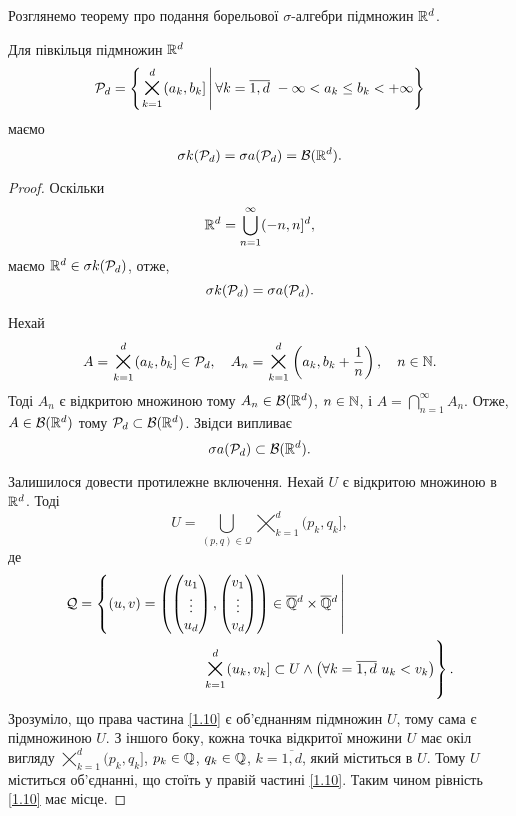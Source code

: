 Розглянемо теорему про подання борельової $\sigma$-алгебри підмножин ${\mathbb R}^d$.

\begin{theorem}
	\label{th-1-6}
	Для півкільця підмножин ${\mathbb R}^d$
	$$
	\PP_d=\left\{\bigtimes_{k=1}^d (a_k,b_k]\midd \forall k=\overline{1,d}\ -\infty< a_k\leq b_k< +\infty\right\}
	$$
	маємо
	$$
	\sigma k(\mathcal P_d)=\sigma a(\mathcal P_d)=\mathcal B({\mathbb R}^d).
	$$
\end{theorem}

\begin{proof}
	Оскільки
	$$
	{\mathbb R}^d=\bigcup_{n=1}^\infty (-n,n]^d,
	$$
	маємо ${\mathbb R}^d\in \sigma k(\mathcal P_d)$, отже, 
	\begin{equation}
	\label{1.8}
	\sigma k(\mathcal P_d)=\sigma a(\mathcal P_d).
	\end{equation}

Нехай
$$
A=\bigtimes_{k=1}^d (a_k,b_k]\in\PP_d, \quad A_n=\bigtimes_{k=1}^d \left(a_k,b_k+\frac1n\right),\quad n\in\N.
$$
Тоді $A_n$ є відкритою множиною тому
$A_n\in\mathcal B({\mathbb R}^d)$, $n\in{\mathbb N}$, і $\displaystyle A=\bigcap_{n=1}^\infty A_n$. Отже, $A\in\mathcal B({\mathbb R}^d)$ тому $\mathcal P_d\subset\mathcal B({\mathbb R}^d)$. Звідси випливає 
\begin{equation}
\label{1.9}
\sigma a(\mathcal P_d)\subset\mathcal B({\mathbb R}^d).
\end{equation}


Залишилося довести протилежне включення. Нехай $U$ є відкритою множиною в ${\mathbb R}^d$. Тоді
\begin{equation}
\label{1.10}
U=\bigcup_{(p,q)\in\mathcal Q} \bigtimes_{k=1}^d (p_k,q_k], 
\end{equation}
де 
\begin{align*}
\mathcal Q&= \left\{(u,v)=\left(\begin{pmatrix}u_1\\ \vdots\\ u_d \end{pmatrix}, \begin{pmatrix}v_1\\ \vdots\\ v_d \end{pmatrix}\right)\in\overline{\Q}{}^d\times \overline{\Q}{}^d \midd 
\right.
\\
&\kern20ex\left. \vphantom{\begin{pmatrix}u_1\\ \vdots\\ u_d \end{pmatrix}}
\bigtimes\limits_{k=1}^d (u_k,v_k]\subset U \land \big(\forall k=\overline{1,d}\   u_k<v_k\big)\right\}.
\end{align*} 
Зрозуміло, що права частина \eqref{1.10} є об'єднанням підмножин $U$, тому сама є підмножиною $U$. З іншого боку, кожна точка відкритої множини $U$ має окіл вигляду  $\bigtimes\limits_{k=1}^d (p_k,q_k]$, $p_k\in{\mathbb Q}$, $q_k\in{\mathbb Q}$, $k=\overline{1,d}$, який міститься в $U$. Тому $U$ міститься об'єднанні, що стоїть у правій частині \eqref{1.10}. Таким чином рівність \eqref{1.10} має місце.


\end{proof}
